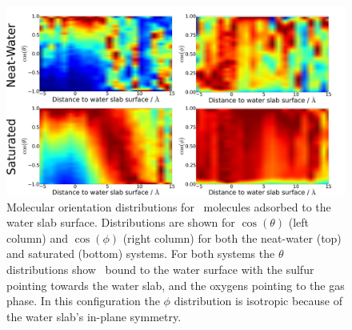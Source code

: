 \begin{figure}[h!]
	\begin{center}
		\includegraphics[scale=1.0]{images/so2-angles/so2-angles.png}
		\caption{Molecular orientation distributions for \suldiox~molecules adsorbed to the water slab surface. Distributions are shown for $\cos(\theta)$ (left column) and $\cos(\phi)$ (right column) for both the neat-water (top) and saturated (bottom) systems. For both systems the $\theta$ distributions show \suldiox~bound to the water surface with the sulfur pointing towards the water slab, and the oxygens pointing to the gas phase. In this configuration the $\phi$ distribution is isotropic because of the water slab's in-plane symmetry.}
		\label{fig:so2-orientation}
	\end{center}
\end{figure}
